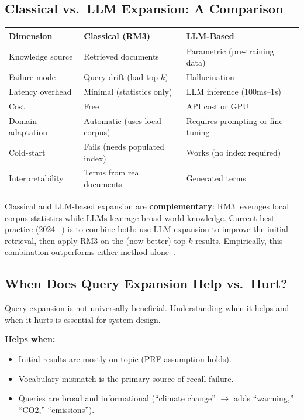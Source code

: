 \documentclass[11pt,a4paper]{article}
\theoremstyle{definition}
\theoremstyle{plain}
\begin{document}
\subsection{Classical vs.\ LLM Expansion: A Comparison}

\begin{center}
\small
\begin{tabular}{lll}
\toprule
\textbf{Dimension} & \textbf{Classical (RM3)} & \textbf{LLM-Based} \\
\midrule
Knowledge source & Retrieved documents & Parametric (pre-training data) \\
Failure mode & Query drift (bad top-$k$) & Hallucination \\
Latency overhead & Minimal (statistics only) & LLM inference (100ms--1s) \\
Cost & Free & API cost or GPU \\
Domain adaptation & Automatic (uses local corpus) & Requires prompting or fine-tuning \\
Cold-start & Fails (needs populated index) & Works (no index required) \\
Interpretability & Terms from real documents & Generated terms \\
\bottomrule
\end{tabular}
\end{center}

\begin{keytakeaway}
Classical and LLM-based expansion are \textbf{complementary}: RM3 leverages local corpus statistics while LLMs leverage broad world knowledge. Current best practice (2024+) is to combine both: use LLM expansion to improve the initial retrieval, then apply RM3 on the (now better) top-$k$ results. Empirically, this combination outperforms either method alone~\cite{wang2023query2doc, jagerman2023query}.
\end{keytakeaway}

\subsection{When Does Query Expansion Help vs.\ Hurt?}

Query expansion is not universally beneficial. Understanding when it helps and when it hurts is essential for system design.

\textbf{Helps when:}
\begin{itemize}
    \item Initial results are mostly on-topic (PRF assumption holds).
    \item Vocabulary mismatch is the primary source of recall failure.
    \item Queries are broad and informational (``climate change'' $\to$ adds ``warming,'' ``CO2,'' ``emissions'').
\end{itemize}
\end{document}
